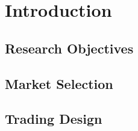 \section{Introduction}

\subsection{Research Objectives}

\subsection{Market Selection}

\subsection{Trading Design}